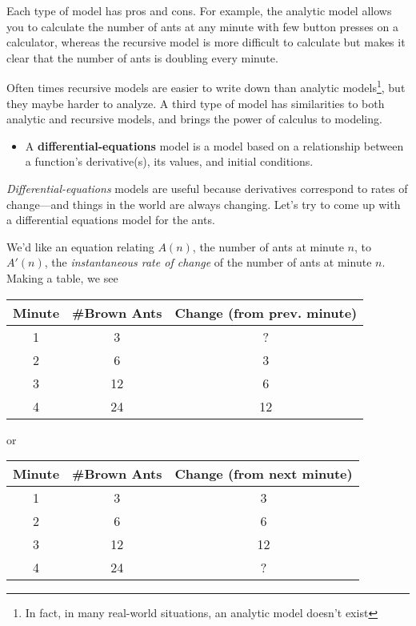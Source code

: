 Each type of model has pros and cons. For example, the analytic model allows you to calculate the number of ants at any minute
with few button presses on a calculator, whereas the recursive model is more difficult to calculate but
makes it clear that the number of ants is doubling every minute.

Often times recursive models are easier to write down than analytic models\footnote{ In fact, in many real-world situations, an analytic model
doesn't exist}, but they maybe harder to analyze. A third type of model has similarities to both analytic and recursive models, and
brings the power of calculus to modeling.

\begin{itemize}
	\item A \textbf{differential-equations} model is a model based on a relationship between a function's derivative(s), its values, and initial conditions.
\end{itemize}

\emph{Differential-equations} models are useful because derivatives correspond to rates of change---and things in the world are always changing.
Let's try to come up with a differential equations model for the ants.

We'd like an equation relating $A(n)$, the number of ants at minute $n$, to $A'(n)$, the \emph{instantaneous rate of change} of the number of ants at minute $n$.
Making a table, we see

\begin{center}
	\begin{tabular}{c|c|c}
		Minute & \#Brown Ants & Change (from prev. minute)\\
		\hline
		1 & 3 & ?\\
		2 & 6 & 3\\
		3 & 12 & 6\\
		4 & 24 & 12\\
	\end{tabular}
\end{center}

or

\begin{center}
	\begin{tabular}{c|c|c}
		Minute & \#Brown Ants & Change (from next minute)\\
		\hline
		1 & 3 & 3\\
		2 & 6 & 6\\
		3 & 12 & 12\\
		4 & 24 & ?\\
	\end{tabular}
\end{center}

